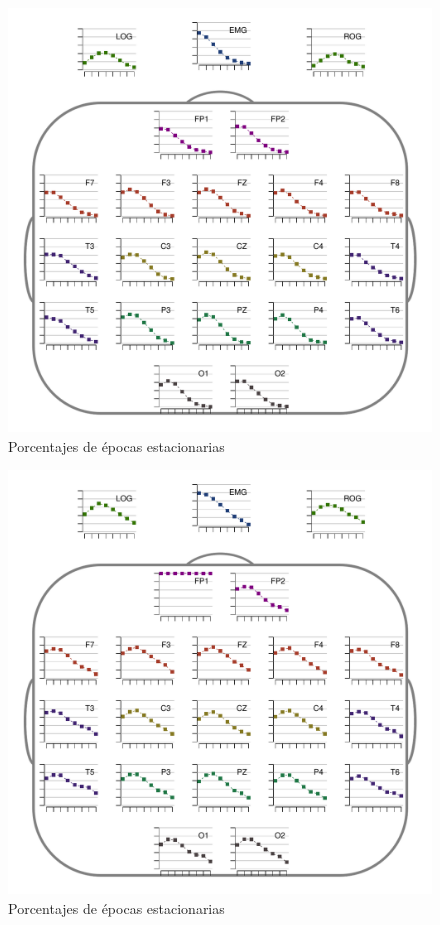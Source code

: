 
\begin{figure}
\centering
\includegraphics[width=.9\linewidth]{./img_resultados/CLMN10SUE_cabeza_epocas_.pdf}
\caption{Porcentajes de épocas estacionarias}
\end{figure}

\begin{figure}
\centering
\includegraphics[width=.9\linewidth]{./img_resultados/RLMN10SUE_cabeza_epocas_.pdf}
\caption{Porcentajes de épocas estacionarias}
\end{figure}

